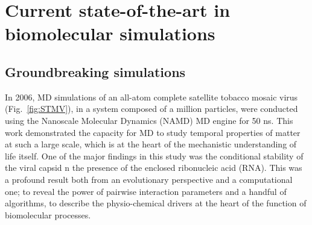 \section{Current state-of-the-art in biomolecular simulations} \label{sec:sota_bio_sims}
\subsection{Groundbreaking simulations}

In 2006, MD simulations of an all-atom complete satellite tobacco mosaic virus (Fig.~\ref{fig:STMV}), in a system composed of a million particles, were conducted using the Nanoscale Molecular Dynamics (NAMD) MD engine for 50 ns. This work demonstrated the capacity for MD to study temporal properties of matter at such a large scale, which is at the heart of the mechanistic understanding of life itself. One of the major findings in this study was the conditional stability of the viral capsid n the presence of the enclosed ribonucleic acid (RNA).\cite{freddolino2006molecular} This was a profound result both from an evolutionary perspective and a computational one; to reveal the power of pairwise interaction parameters and a handful of algorithms, to describe the physio-chemical drivers at the heart of the function of biomolecular processes. 

